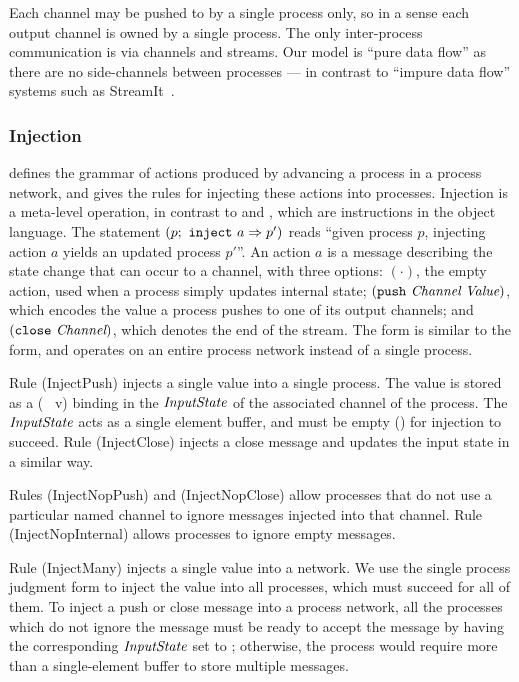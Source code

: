 Each channel may be pushed to by a single process only, so in a sense each output channel is owned by a single process.
The only inter-process communication is via channels and streams.
Our model is ``pure data flow'' as there are no side-channels between processes --- in contrast to ``impure data flow'' systems such as StreamIt~\cite{thies2002streamit}.



\subsubsection{Injection}
 defines the grammar of actions produced by advancing a process in a process network, and gives the rules for injecting these actions into processes.
Injection is a meta-level operation, in contrast to \lstiproc@pull@ and \lstiproc@push@, which are instructions in the object language.
The statement $(p;~\texttt{inject}~a \Rightarrow p')$ reads ``given process $p$, injecting action $a$ yields an updated process $p'$''.
An action $a$ is a message describing the state change that can occur to a channel, with three options: $(\cdot)$, the empty action, used when a process simply updates internal state; $(\texttt{push}~\textit{Channel}~\textit{Value})$, which encodes the value a process pushes to one of its output channels; and $(\texttt{close}~\textit{Channel})$, which denotes the end of the stream.
The \lstiproc@injects@ form is similar to the \lstiproc@inject@ form, and operates on an entire process network instead of a single process.

Rule (InjectPush) injects a single value into a single process. The value is stored as a (\lstiproc@pending@~ v) binding in the $\textit{InputState}$ of the associated channel of the process. The $\textit{InputState}$ acts as a single element buffer, and must be empty (\lstiproc@none@) for injection to succeed.
Rule (InjectClose) injects a close message and updates the input state in a similar way.

Rules (InjectNopPush) and (InjectNopClose) allow processes that do not use a particular named channel to ignore messages injected into that channel.
Rule (InjectNopInternal) allows processes to ignore empty messages.

Rule (InjectMany) injects a single value into a network.
We use the single process judgment form to inject the value into all processes, which must succeed for all of them.
To inject a push or close message into a process network, all the processes which do not ignore the message must be ready to accept the message by having the corresponding $\textit{InputState}$ set to \lstiproc@none@; otherwise, the process would require more than a single-element buffer to store multiple messages.


